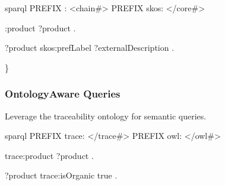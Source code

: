\documentclass[letterpaper,10pt,english]{sphinxmanual}
\begin{document}
\sphinxAtStartPar
{}
{\color{red}\bfseries{}\textasciigrave{}\textasciigrave{}}{\color{red}\bfseries{}\textasciigrave{}}sparql
PREFIX : \textless{}\sphinxhyphen{}chain\#\textgreater{}
PREFIX skos: \textless{}/core\#\textgreater{}
\begin{description}
\begin{description}
\sphinxAtStartPar
:product ?product .

\sphinxAtStartPar
?product skos:prefLabel ?externalDescription .

\end{description}

\sphinxAtStartPar
\}

\end{description}


\subsubsection{Ontology\sphinxhyphen{}Aware Queries}
\label{\detokenize{api/sparql-api:ontology-aware-queries}}
\sphinxAtStartPar
Leverage the traceability ontology for semantic queries.

\sphinxAtStartPar
{}
{\color{red}\bfseries{}\textasciigrave{}\textasciigrave{}}{\color{red}\bfseries{}\textasciigrave{}}sparql
PREFIX trace: \textless{}/trace\#\textgreater{}
PREFIX owl: \textless{}/owl\#\textgreater{}
\begin{description}
\begin{description}
\sphinxAtStartPar
trace:product ?product .

\end{description}

\sphinxAtStartPar
?product trace:isOrganic true .

\end{description}
\end{document}
